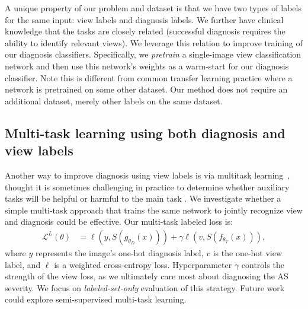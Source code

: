 A unique property of our problem and dataset is that we have two types of labels for the same input: view labels and diagnosis labels.
We further have clinical knowledge that the tasks are closely related (successful diagnosis requires the ability to identify relevant views).
We leverage this relation to improve training of our diagnosis classifiers.
Specifically, we \emph{pretrain} a single-image view classification network and then use this network's weights as a warm-start for our diagnosis classifier.
Note this is different from common transfer learning practice where a network is pretrained on some other dataset.
Our method does not require an additional dataset, merely other labels on the same dataset.

\subsection{Multi-task learning using both diagnosis and view labels}
Another way to improve diagnosis using view labels is via multitask learning~\citep{ruder2017overview,zhang2021survey}, thought it is sometimes challenging in practice to determine whether auxiliary tasks will be helpful or harmful to the main task \citep{zhang2021survey, ruder2017overview}.
We investigate whether a simple multi-task approach that trains the same network to jointly recognize view and diagnosis could be effective. 
Our multi-task labeled loss is:
\begin{align}
\mathcal{L}^L(\theta) 
&= \ell( y, S(g_{\theta_D}(x))) + \gamma \ell( v, S(f_{\theta_V}(x))), 
\label{eq:multitask}
\end{align}
where $y$ represents the image's one-hot diagnosis label, $v$ is the one-hot view label, and $\ell$ is a weighted cross-entropy loss.
Hyperparameter $\gamma$ controls the strength of the view loss, as we ultimately care most about diagnosing the AS severity.
We focus on \emph{labeled-set-only} evaluation of this strategy. Future work could explore semi-supervised multi-task learning.




